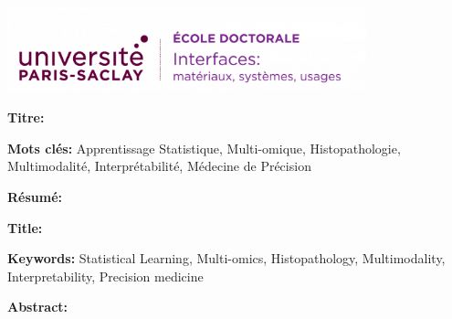 \thispagestyle{empty}


\noindent 
\includegraphics[height=2.45cm]{preamble/ed-interfaces.png}
\vspace{1cm}

\small

\begin{mdframed}[linecolor=Prune,linewidth=1]
	
	\textbf{Titre:} 
	
	\noindent \textbf{Mots clés:} Apprentissage Statistique, Multi-omique, Histopathologie, Multimodalit\'e, Interpr\'etabilit\'e, M\'edecine de Pr\'ecision
	
	\vspace{-.5cm}
	\begin{multicols}{2}
		\noindent \textbf{Résumé:}
		\lipsum[1-2]
	\end{multicols}
	
\end{mdframed}

\vspace{8mm}

\begin{mdframed}[linecolor=Prune,linewidth=1]
	
	\textbf{Title:} 
	
	\noindent \textbf{Keywords:} Statistical Learning, Multi-omics, Histopathology, Multimodality, Interpretability, Precision medicine
	
	\begin{multicols}{2}
		\noindent \textbf{Abstract:} 
		\lipsum[1-2]
	\end{multicols}
\end{mdframed}



